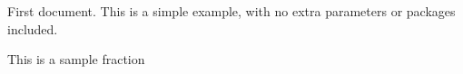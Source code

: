 \documentclass{article}
\begin{document}
First document. This is a simple example, with no extra parameters or packages included.


This is a sample fraction

\end{document}
